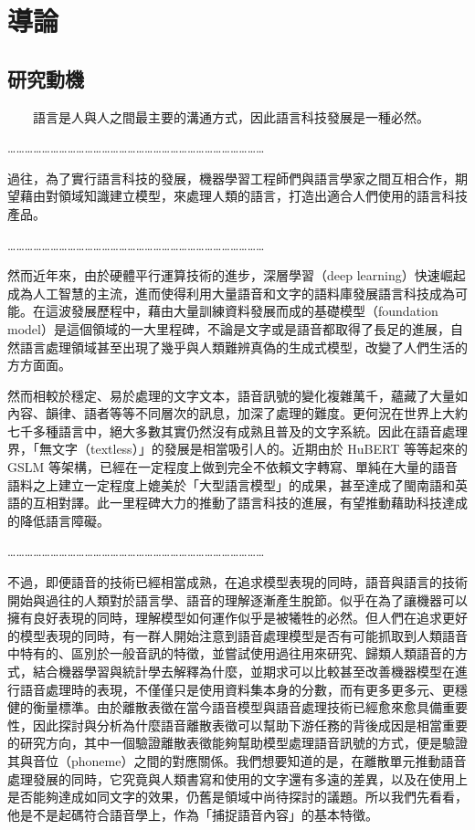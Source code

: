 
\chapter{導論}

\section{研究動機}
　　語言是人與人之間最主要的溝通方式，因此語言科技發展是一種必然。

    ………………………………………………………………………………

    過往，為了實行語言科技的發展，機器學習工程師們與語言學家之間互相合作，期望藉由對領域知識建立模型，來處理人類的語言，打造出適合人們使用的語言科技產品。

    ………………………………………………………………………………

    然而近年來，由於硬體平行運算技術的進步，深層學習（deep learning）快速崛起成為人工智慧的主流，進而使得利用大量語音和文字的語料庫發展語言科技成為可能。在這波發展歷程中，藉由大量訓練資料發展而成的基礎模型（foundation model）是這個領域的一大里程碑，不論是文字或是語音都取得了長足的進展，自然語言處理領域甚至出現了幾乎與人類難辨真偽的生成式模型，改變了人們生活的方方面面。

    然而相較於穩定、易於處理的文字文本，語音訊號的變化複雜萬千，蘊藏了大量如內容、韻律、語者等等不同層次的訊息，加深了處理的難度。更何況在世界上大約七千多種語言中，絕大多數其實仍然沒有成熟且普及的文字系統。因此在語音處理界，「無文字（textless）」的發展是相當吸引人的。近期由於 HuBERT 等等起來的 GSLM 等架構，已經在一定程度上做到完全不依賴文字轉寫、單純在大量的語音語料之上建立一定程度上媲美於「大型語言模型」的成果，甚至達成了閩南語和英語的互相對譯。此一里程碑大力的推動了語言科技的進展，有望推動藉助科技達成的降低語言障礙。

    ………………………………………………………………………………

    不過，即便語音的技術已經相當成熟，在追求模型表現的同時，語音與語言的技術開始與過往的人類對於語言學、語音的理解逐漸產生脫節。似乎在為了讓機器可以擁有良好表現的同時，理解模型如何運作似乎是被犧牲的必然。但人們在追求更好的模型表現的同時，有一群人開始注意到語音處理模型是否有可能抓取到人類語音中特有的、區別於一般音訊的特徵，並嘗試使用過往用來研究、歸類人類語音的方式，結合機器學習與統計學去解釋為什麼，並期求可以比較甚至改善機器模型在進行語音處理時的表現，不僅僅只是使用資料集本身的分數，而有更多更多元、更穩健的衡量標準。由於離散表徵在當今語音模型與語音處理技術已經愈來愈具備重要性，因此探討與分析為什麼語音離散表徵可以幫助下游任務的背後成因是相當重要的研究方向，其中一個驗證離散表徵能夠幫助模型處理語音訊號的方式，便是驗證其與音位（phoneme）之間的對應關係。我們想要知道的是，在離散單元推動語音處理發展的同時，它究竟與人類書寫和使用的文字還有多遠的差異，以及在使用上是否能夠達成如同文字的效果，仍舊是領域中尚待探討的議題。所以我們先看看，他是不是起碼符合語音學上，作為「捕捉語音內容」的基本特徵。













